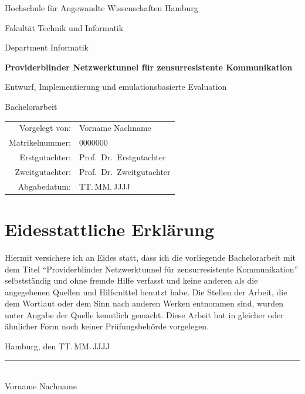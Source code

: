 \documentclass[12pt,a4paper,oneside,bibliography=totoc,listof=totoc,parskip=half]{scrbook}
\newcommand{\arbeittitel}{Providerblinder Netzwerktunnel für zensurresistente Kommunikation}
\newcommand{\arbeituntertitel}{Entwurf, Implementierung und emulationsbasierte Evaluation}
\newcommand{\autorname}{Vorname Nachname}
\newcommand{\matrikelnr}{0000000}
\newcommand{\erstgutachter}{Prof.\ Dr.\ Erstgutachter}
\newcommand{\zweitgutachter}{Prof.\ Dr.\ Zweitgutachter}
\newcommand{\abgabedatum}{TT.\,MM.\,JJJJ}
\begin{document}
\frontmatter

\begin{titlepage}
  \centering
  {\large Hochschule für Angewandte Wissenschaften Hamburg\par}
  {\large Fakultät Technik und Informatik\par}
  {\large Department Informatik\par}
  \vfill
  {\Large\bfseries \arbeittitel\par}
  \vspace{0.5em}
  {\large \arbeituntertitel\par}
  \vspace{2em}
  {\large Bachelorarbeit\par}
  \vfill
  \begin{tabular}{rl}
    Vorgelegt von: & \autorname \\
    Matrikelnummer: & \matrikelnr \\[1em]
    Erstgutachter: & \erstgutachter \\
    Zweitgutachter: & \zweitgutachter \\[1em]
    Abgabedatum: & \abgabedatum \\
  \end{tabular}
  \vfill
\end{titlepage}

\chapter*{Eidesstattliche Erklärung}
\thispagestyle{plain}
Hiermit versichere ich an Eides statt, dass ich die vorliegende Bachelorarbeit
mit dem Titel \enquote{\arbeittitel} selbstständig und ohne fremde Hilfe
verfasst und keine anderen als die angegebenen Quellen und Hilfsmittel benutzt
habe. Die Stellen der Arbeit, die dem Wortlaut oder dem Sinn nach anderen Werken
entnommen sind, wurden unter Angabe der Quelle kenntlich gemacht. Diese Arbeit
hat in gleicher oder ähnlicher Form noch keiner Prüfungsbehörde vorgelegen.
\par\vspace{3em}
\noindent Hamburg, den \abgabedatum \hfill\rule{6cm}{0.4pt}\\
\hspace*{\fill}\autorname

\end{document}
